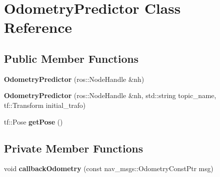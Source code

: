 \hypertarget{classOdometryPredictor}{}\section{Odometry\+Predictor Class Reference}
\label{classOdometryPredictor}
\subsection*{Public Member Functions}
\begin{DoxyCompactItemize}
\item 
{\bfseries Odometry\+Predictor} (ros\+::\+Node\+Handle \&nh)\hypertarget{classOdometryPredictor_a9b4cc16ef852f876d3628213e341d263}{}\label{classOdometryPredictor_a9b4cc16ef852f876d3628213e341d263}

\item 
{\bfseries Odometry\+Predictor} (ros\+::\+Node\+Handle \&nh, std\+::string topic\+\_\+name, tf\+::\+Transform initial\+\_\+trafo)\hypertarget{classOdometryPredictor_a18c088e85a802c82732fdc0f8dcbb961}{}\label{classOdometryPredictor_a18c088e85a802c82732fdc0f8dcbb961}

\item 
tf\+::\+Pose {\bfseries get\+Pose} ()\hypertarget{classOdometryPredictor_ac7c175fe97fec3d08c95be541c6551c9}{}\label{classOdometryPredictor_ac7c175fe97fec3d08c95be541c6551c9}

\end{DoxyCompactItemize}
\subsection*{Private Member Functions}
\begin{DoxyCompactItemize}
\item 
void {\bfseries callback\+Odometry} (const nav\+\_\+msgs\+::\+Odometry\+Const\+Ptr msg)\hypertarget{classOdometryPredictor_abfa0a69c2ba018d53e7976853366b833}{}\label{classOdometryPredictor_abfa0a69c2ba018d53e7976853366b833}

\end{DoxyCompactItemize}
